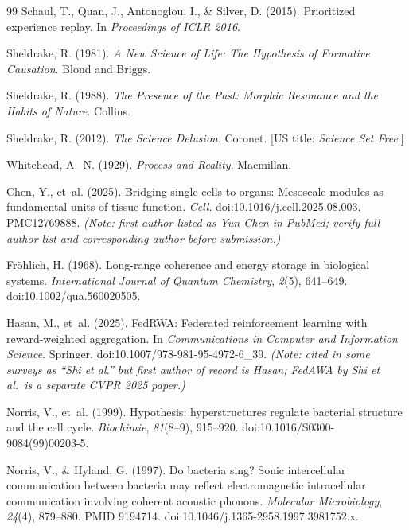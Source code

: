 \documentclass[twoside,11pt]{article}
\begin{document}
\begin{thebibliography}{99}
Schaul, T., Quan, J., Antonoglou, I., \& Silver, D. (2015).
Prioritized experience replay.
In \textit{Proceedings of ICLR 2016}.

Sheldrake, R. (1981).
\textit{A New Science of Life: The Hypothesis of Formative Causation}.
Blond and Briggs.

Sheldrake, R. (1988).
\textit{The Presence of the Past: Morphic Resonance and the Habits of Nature}.
Collins.

Sheldrake, R. (2012).
\textit{The Science Delusion}.
Coronet. [US title: \textit{Science Set Free}.]

Whitehead, A.~N. (1929).
\textit{Process and Reality}.
Macmillan.


Chen, Y., et~al. (2025).
Bridging single cells to organs: Mesoscale modules as fundamental units of
tissue function.
\textit{Cell}.
\textrm{doi:10.1016/j.cell.2025.08.003.  PMC12769888.}
\textit{(Note: first author listed as Yun Chen in PubMed; verify full author
list and corresponding author before submission.)}

Fröhlich, H. (1968).
Long-range coherence and energy storage in biological systems.
\textit{International Journal of Quantum Chemistry}, \textit{2}(5), 641--649.
\textrm{doi:10.1002/qua.560020505.}

Hasan, M., et~al. (2025).
FedRWA: Federated reinforcement learning with reward-weighted aggregation.
In \textit{Communications in Computer and Information Science}.
Springer.
\textrm{doi:10.1007/978-981-95-4972-6\_39.}
\textit{(Note: cited in some surveys as ``Shi et al.'' but first author of
record is Hasan; FedAWA by Shi et al.\ is a separate CVPR 2025 paper.)}

Norris, V., et~al. (1999).
Hypothesis: hyperstructures regulate bacterial structure and the cell cycle.
\textit{Biochimie}, \textit{81}(8--9), 915--920.
\textrm{doi:10.1016/S0300-9084(99)00203-5.}

Norris, V., \& Hyland, G. (1997).
Do bacteria sing?  Sonic intercellular communication between bacteria may
reflect electromagnetic intracellular communication involving coherent
acoustic phonons.
\textit{Molecular Microbiology}, \textit{24}(4), 879--880.
\textrm{PMID 9194714.  doi:10.1046/j.1365-2958.1997.3981752.x.}


\end{thebibliography}
\end{document}
